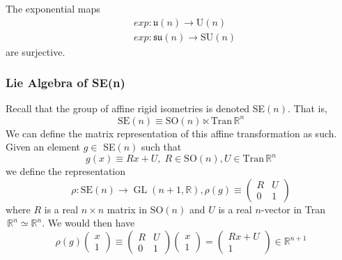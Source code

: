 \documentclass{article}
\DeclareMathOperator{\GL}{GL}
\begin{document}
      \begin{theorem}
      The exponential maps 
      \begin{align*}
        & exp: \mathfrak{u}(n) \longrightarrow \text{U}(n) \\
        & exp: \mathfrak{su}(n) \longrightarrow \text{SU}(n)
      \end{align*}
      are surjective. 
      \end{theorem}

    \subsubsection{Lie Algebra of SE(n)}

      Recall that the group of affine rigid isometries is denoted SE$(n)$. That is, 
      \begin{equation}
        \text{SE}(n) \equiv \text{SO}(n) \ltimes \text{Tran}\,\mathbb{R}^n
      \end{equation}
      We can define the matrix representation of this affine transformation as such. Given an element $g \in$ SE$(n)$ such that
      \begin{equation}
        g(x) \equiv R x + U, \; R \in \text{SO}(n), U \in \text{Tran}\, \mathbb{R}^n 
      \end{equation}
      we define the representation
      \begin{equation}
        \rho: \text{SE}(n) \longrightarrow \GL(n+1, \mathbb{R}), \rho(g) \equiv \begin{pmatrix}
        R&U\\0&1
        \end{pmatrix}
      \end{equation}
      where $R$ is a real $n\times n$ matrix in SO$(n)$ and $U$ is a real $n$-vector in Tran$\,\mathbb{R}^n \simeq \mathbb{R}^n$. We would then have
      \begin{equation}
        \rho(g) \begin{pmatrix}
        x\\1
        \end{pmatrix} \equiv \begin{pmatrix}
        R&U\\0&1
        \end{pmatrix} \begin{pmatrix}
        x\\1
        \end{pmatrix} = \begin{pmatrix}
        R x + U\\1
        \end{pmatrix} \in \mathbb{R}^{n+1}
      \end{equation}
\end{document}
